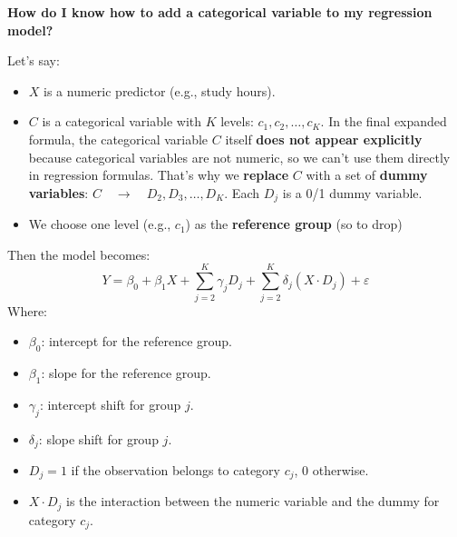 \newpage

\begin{flushleft}
    \textcolor{Green3}{ \textbf{How do I know how to add a categorical variable to my regression model?}}
\end{flushleft}
Let's say:
\begin{itemize}
    \item $X$ is a numeric predictor (e.g., study hours).
    \item $C$ is a categorical variable with $K$ levels: $c_1, c_2, \dots, c_K$. In the final expanded formula, the categorical variable $C$ itself \textbf{does not appear explicitly} because categorical variables are not numeric, so we can't use them directly in regression formulas. That's why we \textbf{replace} $C$ with a set of \textbf{dummy variables}: $C \quad \longrightarrow \quad D_2, D_3, \dots, D_K$.
    Each $D_j$ is a 0/1 dummy variable.
    \item We choose one level (e.g., $c_1$) as the \textbf{reference group} (so to drop)
\end{itemize}
Then the model becomes:
\begin{equation}
    Y = \beta_0 
        + \beta_1 X
        + \displaystyle\sum_{j=2}^K \gamma_j D_j
        + \displaystyle\sum_{j=2}^K \delta_j \left(X \cdot D_j\right)
        + \varepsilon
\end{equation}
Where:
\begin{itemize}
    \item $\beta_0$: intercept for the reference group.
    \item $\beta_1$: slope for the reference group.
    \item $\gamma_j$: intercept shift for group $j$.
    \item $\delta_j$: slope shift for group $j$.
    \item $D_j = 1$ if the observation belongs to category $c_j$, 0 otherwise.
    \item $X \cdot D_j$ is the interaction between the numeric variable and the dummy for category $c_j$.
\end{itemize}

